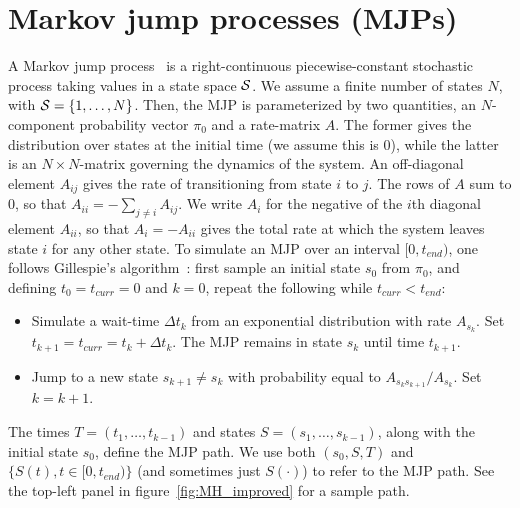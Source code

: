 \section{Markov jump processes (MJPs)} 
\label{sec:mjp}
A Markov jump process~\citep{Cinlar1975} is a right-continuous piecewise-constant stochastic process taking values in a state space ${\mathcal S}$. %
We assume a finite number of states $N$, with ${\mathcal S} = \{1,\ldots,N\}$. 
Then, the MJP is parameterized by two quantities, an $N$-component probability vector $\pi_0$ and a rate-matrix $A$. 
The former gives the distribution over states at the initial time (we assume this is $0$), while the latter is an $N \times N$-matrix governing the dynamics of the system.  
An off-diagonal element $A_{ij}$ gives the rate of transitioning from state $i$ to $j$. 
The rows of $A$ sum to $0$, so that $A_{ii}=-\sum_{j \neq i} A_{ij}  $. 
We write $A_i$ for the negative of the $i$th diagonal element $A_{ii}$, so that $A_i = -A_{ii}$ gives the total rate at which the system leaves state $i$ for any other state.
To simulate an MJP over an interval $[0,t_{end})$, one follows Gillespie's algorithm~\citep{gillespie97}: 
first sample an initial state $s_0$ from $\pi_0$, and defining $t_0 = t_{curr} = 0$ and $k = 0$, repeat the following while $t_{curr} < t_{end}$:
\begin{itemize}
  \item Simulate a wait-time $\Delta t_k$ from an exponential distribution with rate $A_{s_k}$.  
    Set $t_{k+1} = t_{curr} = t_{k} + \Delta t_k$. 
    The MJP remains in state $s_k$ until time $t_{k+1}$.
  \item Jump to a new state $s_{k+1} \neq s_k$ with probability equal to $A_{s_ks_{k+1}}/A_{s_k}$. Set $k=k+1$.
\end{itemize}
The times $T=(t_1, \dotsc, t_{k - 1})$ and states $S=(s_1, \dotsc, s_{k - 1 })$, along with the initial state $s_0$, define the MJP path. 
We use both $(s_0,S,T)$ and  $\{S(t), t \in [0,t_{end})\}$ (and sometimes just $S(\cdot)$) to refer to the MJP path.
See the top-left panel in figure~\ref{fig:MH_improved} for a sample path.

\vspace{-.15in}
